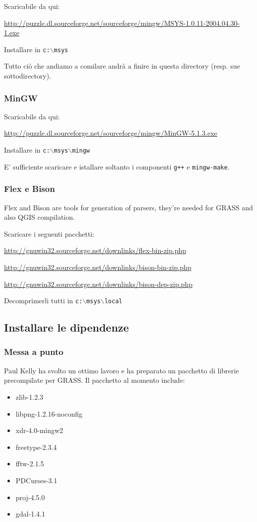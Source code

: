 Scaricabile da qui:

\url{http://puzzle.dl.sourceforge.net/sourceforge/mingw/MSYS-1.0.11-2004.04.30-1.exe}

Installare in \texttt{c:$\backslash$msys}

Tutto ciò che andiamo a comilare andrà a finire in questa directory (resp. sue sottodirectory).

\subsubsection{MinGW}
Scaricabile da qui:

\url{http://puzzle.dl.sourceforge.net/sourceforge/mingw/MinGW-5.1.3.exe}

Installare in \texttt{c:$\backslash$msys$\backslash$mingw}

E' sufficiente scaricare e istallare soltanto i componenti \texttt{g++} e \texttt{mingw-make}.

\subsubsection{Flex e Bison}
Flex and Bison are tools for generation of parsers, they're needed for GRASS and also QGIS compilation.

Scaricare i seguenti pacchetti:

\url{http://gnuwin32.sourceforge.net/downlinks/flex-bin-zip.php}

\url{http://gnuwin32.sourceforge.net/downlinks/bison-bin-zip.php}

\url{http://gnuwin32.sourceforge.net/downlinks/bison-dep-zip.php}

Decomprimerli tutti in \texttt{c:$\backslash$msys$\backslash$local}

\subsection{Installare le dipendenze}
\subsubsection{Messa a punto}
Paul Kelly ha svolto un ottimo lavoro e ha preparato un pacchetto di librerie precompilate per GRASS.
Il pacchetto al momento include:

\begin{itemize}
\item zlib-1.2.3
\item libpng-1.2.16-noconfig
\item xdr-4.0-mingw2
\item freetype-2.3.4
\item fftw-2.1.5
\item PDCurses-3.1
\item proj-4.5.0
\item gdal-1.4.1
\end{itemize}

